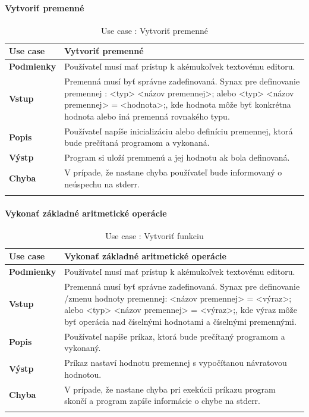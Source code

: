 \paragraph{Vytvoriť premenné}
\begin{center}
	\begin{longtable}{|p{2.5cm}|p{14cm}|}
		
			\hline
			\textbf{Use case} & Vytvoriť premenné \\ 
			\hline
			\textbf{Podmienky} & Používateľ musí mať prístup k akémukoľvek textovému editoru.  \\ 
			\hline
			\textbf{Vstup} & Premenná musí byť správne zadefinovaná. 
			Synax pre definovanie premennej : 
			<typ> <názov premennej>; alebo 
			 <typ> <názov premennej> = <hodnota>;, kde hodnota môže byť konkrétna hodnota alebo iná premenná rovnakého typu.\\
			\hline
			\textbf{Popis} & Používateľ napíše inicializáciu alebo definíciu premennej, ktorá bude prečítaná programom a vykonaná.\\ 
			\hline
			\textbf{Výstp} & Program si uloží premmenú a jej hodnotu ak bola definovaná.\\
			\hline
			\textbf{Chyba} & V prípade, že nastane chyba používateľ bude informovaný o neúspechu na stderr.\\
			\hline
			\caption{Use case : Vytvoriť premenné}
		\label{table:1}
	
	\end{longtable}
\end{center}
\paragraph{Vykonať základné aritmetické operácie}
\begin{center}
	\begin{longtable}{|p{2.5cm}|p{14cm}|}
		
			\hline
			\textbf{Use case} & Vykonať základné aritmetické operácie \\ 
			\hline
			\textbf{Podmienky} & Používateľ musí mať prístup k akémukoľvek textovému editoru.  \\ 
			\hline
			\textbf{Vstup} & Premenná musí byť správne zadefinovaná. 
			Synax pre definovanie /zmenu hodnoty premennej: 
			<názov premennej> = <výraz>; alebo 
			<typ> <názov premennej> = <výraz>;, kde výraz môže byť operácia nad číselnými hodnotami a číselnými premennými. \\
			\hline
			\textbf{Popis} & Používateľ napíše príkaz, ktorá bude prečítaný programom a vykonaný.\\ 
			\hline
			\textbf{Výstp} & Príkaz nastaví hodnotu premennej s vypočítanou návratovou hodnotou.\\
			\hline
			\textbf{Chyba} & V prípade, že nastane chyba pri exekúcii príkazu program skončí a program zapíše informácie o chybe na stderr.\\
			\hline
		\caption{Use case : Vytvoriť funkciu}
		\label{table:1}
		
	\end{longtable}
\end{center}
